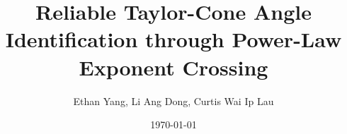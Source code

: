 \documentclass[11pt]{article}
\title{\textbf{Reliable Taylor-Cone Angle Identification through Power-Law Exponent Crossing}}
\author{Ethan Yang, Li Ang Dong, Curtis Wai Ip Lau}
\date{\today}
\begin{document}
\maketitle

\begin{abstract}
\setlength{\emergencystretch}{2em}

\end{abstract}

\tableofcontents
\newpage










\newpage


\end{document}
